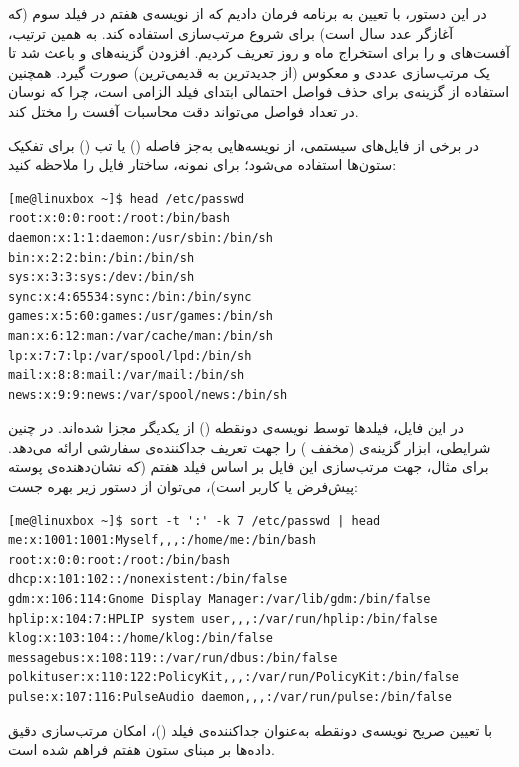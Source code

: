 در این دستور، با تعیین  به برنامه فرمان دادیم که از نویسه‌ی هفتم در فیلد سوم (که آغازگر عدد سال است) برای شروع مرتب‌سازی استفاده کند. به همین ترتیب، آفست‌های  و  را برای استخراج ماه و روز تعریف کردیم. افزودن گزینه‌های  و  باعث شد تا یک مرتب‌سازی عددی و معکوس (از جدیدترین به قدیمی‌ترین) صورت گیرد. همچنین استفاده از گزینه‌ی  برای حذف فواصل احتمالی ابتدای فیلد الزامی است، چرا که نوسان در تعداد فواصل می‌تواند دقت محاسبات آفست را مختل کند.

در برخی از فایل‌های سیستمی، از نویسه‌هایی به‌جز فاصله () یا تب () برای تفکیک ستون‌ها استفاده می‌شود؛ برای نمونه، ساختار فایل  را ملاحظه کنید:

\begin{latin}
\begin{lstlisting}
[me@linuxbox ~]$ head /etc/passwd
root:x:0:0:root:/root:/bin/bash
daemon:x:1:1:daemon:/usr/sbin:/bin/sh
bin:x:2:2:bin:/bin:/bin/sh
sys:x:3:3:sys:/dev:/bin/sh
sync:x:4:65534:sync:/bin:/bin/sync
games:x:5:60:games:/usr/games:/bin/sh
man:x:6:12:man:/var/cache/man:/bin/sh
lp:x:7:7:lp:/var/spool/lpd:/bin/sh
mail:x:8:8:mail:/var/mail:/bin/sh
news:x:9:9:news:/var/spool/news:/bin/sh
\end{lstlisting}
\end{latin}

در این فایل، فیلدها توسط نویسه‌ی دونقطه (\cmd{:}) از یکدیگر مجزا شده‌اند. در چنین شرایطی، ابزار  گزینه‌ی  (مخفف ) را جهت تعریف جداکننده‌ی سفارشی ارائه می‌دهد. برای مثال، جهت مرتب‌سازی این فایل بر اساس فیلد هفتم (که نشان‌دهنده‌ی پوسته پیش‌فرض یا  کاربر است)، می‌توان از دستور زیر بهره جست:

\begin{latin}
\begin{lstlisting}
[me@linuxbox ~]$ sort -t ':' -k 7 /etc/passwd | head
me:x:1001:1001:Myself,,,:/home/me:/bin/bash
root:x:0:0:root:/root:/bin/bash
dhcp:x:101:102::/nonexistent:/bin/false
gdm:x:106:114:Gnome Display Manager:/var/lib/gdm:/bin/false
hplip:x:104:7:HPLIP system user,,,:/var/run/hplip:/bin/false
klog:x:103:104::/home/klog:/bin/false
messagebus:x:108:119::/var/run/dbus:/bin/false
polkituser:x:110:122:PolicyKit,,,:/var/run/PolicyKit:/bin/false
pulse:x:107:116:PulseAudio daemon,,,:/var/run/pulse:/bin/false
\end{lstlisting}
\end{latin}

با تعیین صریح نویسه‌ی دونقطه به‌عنوان جداکننده‌ی فیلد ()، امکان مرتب‌سازی دقیق داده‌ها بر مبنای ستون هفتم فراهم شده است.

